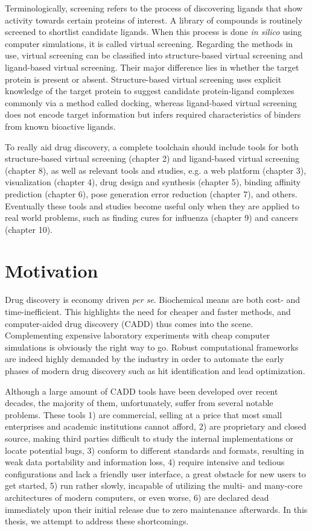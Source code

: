 Terminologically, screening refers to the process of discovering ligands that show activity towards certain proteins of interest. A library of compounds is routinely screened to shortlist candidate ligands. When this process is done \textit{in silico} using computer simulations, it is called virtual screening. Regarding the methods in use, virtual screening can be classified into structure-based virtual screening and ligand-based virtual screening. Their major difference lies in whether the target protein is present or absent. Structure-based virtual screening uses explicit knowledge of the target protein to suggest candidate protein-ligand complexes commonly via a method called docking, whereas ligand-based virtual screening does not encode target information but infers required characteristics of binders from known bioactive ligands.

To really aid drug discovery, a complete toolchain should include tools for both structure-based virtual screening (chapter 2) and ligand-based virtual screening (chapter 8), as well as relevant tools and studies, e.g. a web platform (chapter 3), visualization (chapter 4), drug design and synthesis (chapter 5), binding affinity prediction (chapter 6), pose generation error reduction (chapter 7), and others. Eventually these tools and studies become useful only when they are applied to real world problems, such as finding cures for influenza (chapter 9) and cancers (chapter 10).

\section{Motivation}

Drug discovery is economy driven \textit{per se}. Biochemical means are both cost- and time-inefficient. This highlights the need for cheaper and faster methods, and computer-aided drug discovery (CADD) thus comes into the scene. Complementing expensive laboratory experiments with cheap computer simulations is obviously the right way to go. Robust computational frameworks are indeed highly demanded by the industry in order to automate the early phases of modern drug discovery such as hit identification and lead optimization.

Although a large amount of CADD tools have been developed over recent decades, the majority of them, unfortunately, suffer from several notable problems. These tools 1) are commercial, selling at a price that most small enterprises and academic institutions cannot afford, 2) are proprietary and closed source, making third parties difficult to study the internal implementations or locate potential bugs, 3) conform to different standards and formats, resulting in weak data portability and information loss, 4) require intensive and tedious configurations and lack a friendly user interface, a great obstacle for new users to get started, 5) run rather slowly, incapable of utilizing the multi- and many-core architectures of modern computers, or even worse, 6) are declared dead immediately upon their initial release due to zero maintenance afterwards. In this thesis, we attempt to address these shortcomings.

